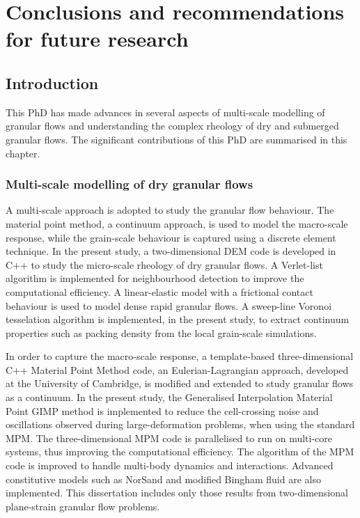 \chapter{Conclusions and recommendations for future research}

\ifpdf
    \graphicspath{{Chapter7/figs/raster/}{Chapter7/figs/pdf/}{Chapter7/figs/}}
\else
    \graphicspath{{Chapter7/figs/vector/}{Chapter7/figs/}}
\fi
\section{Introduction}

This PhD has made advances in several aspects of multi-scale modelling of 
granular flows and understanding the complex rheology of dry and submerged 
granular flows. The significant contributions of this PhD are summarised in 
this chapter.

\subsection{Multi-scale modelling of dry granular flows}

A multi-scale approach is adopted to study the granular flow behaviour. The 
material point method, a 
continuum approach, is used to model the macro-scale response, while the 
grain-scale behaviour is captured using a discrete element 
technique. In the 
present study, a two-dimensional DEM code is developed in C++ to study the 
micro-scale rheology of dry granular flows. A Verlet-list algorithm is 
implemented for neighbourhood detection to improve the computational 
efficiency. A linear-elastic model with a frictional contact behaviour is used 
to model dense rapid granular flows. A sweep-line Voronoi tesselation algorithm 
is implemented, in the present study, to extract continuum properties such as 
packing density from the local grain-scale simulations.

In order to capture the macro-scale response, a template-based 
three-dimensional C++ Material Point Method code, an Eulerian-Lagrangian 
approach, developed at the University of Cambridge, is modified and extended to 
study granular flows as a continuum. In the present study, the Generalised 
Interpolation Material Point GIMP method is implemented to reduce the 
cell-crossing noise and oscillations observed during large-deformation 
problems, 
when using the standard MPM. The three-dimensional MPM code is parallelised to 
run on multi-core systems, thus improving the computational efficiency. The 
algorithm of the MPM code is improved to handle multi-body dynamics and 
interactions. Advanced constitutive models such as NorSand and 
modified Bingham fluid are also implemented. This dissertation includes 
only those results from two-dimensional plane-strain granular flow problems. 


